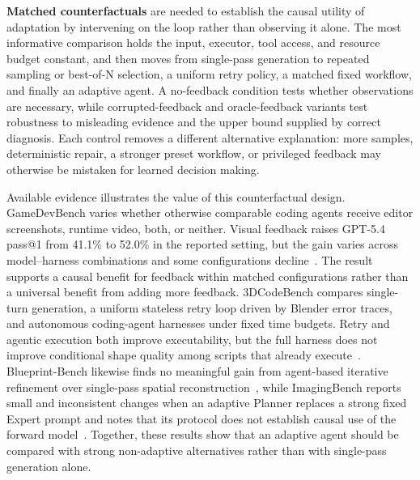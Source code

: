 \textbf{Matched counterfactuals} are needed to establish the causal utility of adaptation by intervening on the loop rather than observing it alone. The most informative comparison holds the input, executor, tool access, and resource budget constant, and then moves from single-pass generation to repeated sampling or best-of-N selection, a uniform retry policy, a matched fixed workflow, and finally an adaptive agent. A no-feedback condition tests whether observations are necessary, while corrupted-feedback and oracle-feedback variants test robustness to misleading evidence and the upper bound supplied by correct diagnosis. Each control removes a different alternative explanation: more samples, deterministic repair, a stronger preset workflow, or privileged feedback may otherwise be mistaken for learned decision making.

Available evidence illustrates the value of this counterfactual design. GameDevBench varies whether otherwise comparable coding agents receive editor screenshots, runtime video, both, or neither. Visual feedback raises GPT-5.4 pass@1 from 41.1\% to 52.0\% in the reported setting, but the gain varies across model--harness combinations and some configurations decline~\cite{avg260211103}. The result supports a causal benefit for feedback within matched configurations rather than a universal benefit from adding more feedback. 3DCodeBench compares single-turn generation, a uniform stateless retry loop driven by Blender error traces, and autonomous coding-agent harnesses under fixed time budgets. Retry and agentic execution both improve executability, but the full harness does not improve conditional shape quality among scripts that already execute~\cite{avg260601057}. Blueprint-Bench likewise finds no meaningful gain from agent-based iterative refinement over single-pass spatial reconstruction~\cite{avg250925229}, while ImagingBench reports small and inconsistent changes when an adaptive Planner replaces a strong fixed Expert prompt and notes that its protocol does not establish causal use of the forward model~\cite{avg260707189}. Together, these results show that an adaptive agent should be compared with strong non-adaptive alternatives rather than with single-pass generation alone.

